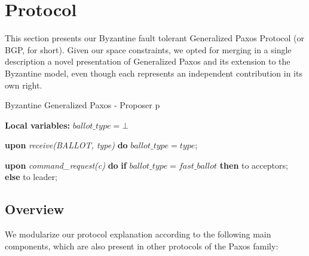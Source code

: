 \section{Protocol}

This section presents our Byzantine fault tolerant Generalized Paxos
Protocol (or BGP, for short). Given our space constraints, we opted
for merging in a single description a novel presentation of
Generalized Paxos and its extension to the Byzantine model, even though
each represents an independent contribution in its own right.


\begin{algorithm}
	\caption{Byzantine Generalized Paxos - Proposer p}
	\label{BFT-Prop}
	\textbf{Local variables:} $ballot\_type = \bot$
	\begin{algorithmic}[1]	
		
		\State \textbf{upon} \textit{receive(BALLOT, type)} \textbf{do} 
		\State \hspace{\algorithmicindent} $ballot\_type = type$;
		\State
		
		\State \textbf{upon} \textit{command\_request(c)} \textbf{do}   \hspace{\algorithmicindent}\hspace{\algorithmicindent}\hspace{\algorithmicindent}\hspace{\algorithmicindent}
		\State \hspace{\algorithmicindent} \textbf{if} $ballot\_type = fast\_ballot$ \textbf{then}
		\State \hspace{\algorithmicindent}\hspace{\algorithmicindent}  to acceptors;
		\State \hspace{\algorithmicindent} \textbf{else} 
		\State \hspace{\algorithmicindent}\hspace{\algorithmicindent}  to leader;		
	\end{algorithmic}
\end{algorithm}

\subsection{Overview}
We modularize our protocol explanation according to the following main components, which are also present in other protocols of the Paxos family:

